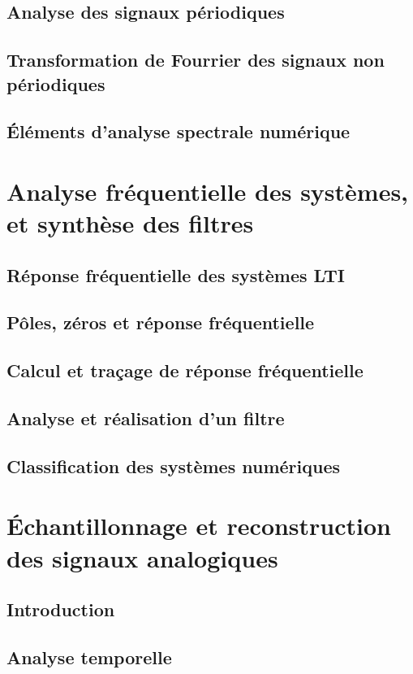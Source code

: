 \documentclass[10pt, twocolumn]{article}
\begin{document}
		\subsection*{Analyse des signaux périodiques}
		\subsection*{Transformation de Fourrier des signaux non périodiques}
		\subsection*{Éléments d'analyse spectrale numérique}
	
	\section*{Analyse fréquentielle des systèmes, et synthèse des filtres}
		
		\subsection*{Réponse fréquentielle des systèmes LTI}
		\subsection*{Pôles, zéros et réponse fréquentielle}
		\subsection*{Calcul et traçage de réponse fréquentielle}
		\subsection*{Analyse et réalisation d'un filtre}
		\subsection*{Classification des systèmes numériques}
		
	\section*{Échantillonnage et reconstruction des signaux analogiques}
	
		\subsection*{Introduction}
		\subsection*{Analyse temporelle}
\end{document}

